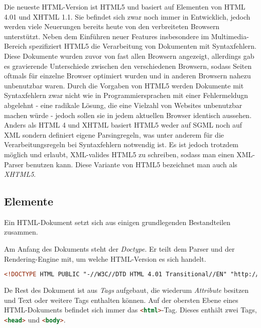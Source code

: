 Die neueste HTML-Version ist HTML5 und basiert auf Elementen von HTML 4.01 und XHTML 1.1.
Sie befindet sich zwar noch immer in Entwicklich, jedoch werden viele Neuerungen bereits heute von
den verbreiteten Browsern unterstützt. Neben dem Einführen neuer Features insbesondere im
Multimedia-Bereich spezifiziert HTML5 die Verarbeitung von Dokumenten mit Syntaxfehlern. \citep{w3c:html5}
Diese Dokumente wurden zuvor von fast allen Browsern angezeigt, allerdings gab es gravierende
Unterschiede zwischen den verschiedenen Browsern, sodass Seiten oftmals für einzelne Browser
optimiert wurden und in anderen Browsern nahezu unbenutzbar waren. Durch die Vorgaben von HTML5
werden Dokumente mit Syntaxfehlern zwar nicht wie in Programmiersprachen mit einer Fehlermeldugn
abgelehnt - eine radikale Lösung, die eine Vielzahl von Websites unbenutzbar machen würde - jedoch
sollen sie in jedem aktuellen Browser identisch aussehen.
Anders als HTML 4 und XHTML basiert HTML5 weder auf SGML noch auf XML sondern definiert eigene
Parsingregeln, was unter anderem für die Verarbeitungsregeln bei Syntaxfehlern notwendig ist. Es ist
jedoch trotzdem möglich und erlaubt, XML-valides HTML5 zu schreiben, sodass man einen XML-Parser
benutzen kann. Diese Variante von HTML5 bezeichnet man auch als \emph{XHTML5}.



\subsection{Elemente}
Ein HTML-Dokument setzt sich aus einigen grundlegenden Bestandteilen zusammen.

Am Anfang des Dokuments steht der \emph{Doctype}. Er teilt dem Parser und der Rendering-Engine mit,
um welche HTML-Version es sich handelt.

\begin{lstlisting}[language=HTML,caption=Doctype von HTML 4.01]
<!DOCTYPE HTML PUBLIC "-//W3C//DTD HTML 4.01 Transitional//EN" "http://www.w3.org/TR/html4/loose.dtd">
\end{lstlisting}

De Rest des Dokument ist aus \emph{Tags} aufgebaut, die wiederum \emph{Attribute} besitzen und Text
oder weitere Tags enthalten können. Auf der obersten Ebene eines HTML-Dokuments befindet sich immer
das \lstinline[language=HTML]{<html>}-Tag. Dieses enthält zwei Tags,
\lstinline[language=HTML]{<head>} und \lstinline[language=HTML]{<body>}.

